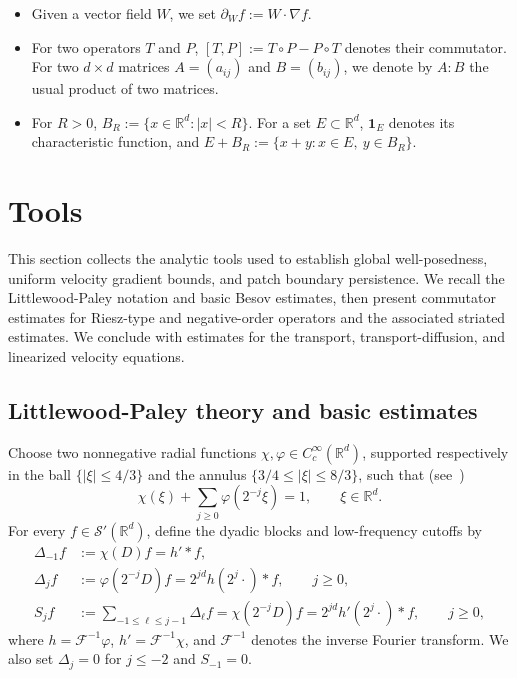 \documentclass[reqno,11pt,a4paper]{amsart}
\newcommand{\R}{\ensuremath{\mathbb{R}}}
\begin{document}
\begin{itemize}
    \item
    Given a vector field $W$, we set
    $\partial_{W}f:=W\cdot\nabla f$.

    \item
    For two operators $T$ and $P$,
    $[T,P]:=T\circ P-P\circ T$ denotes their commutator.
    For two $d\times d$ matrices $A=(a_{ij})$ and $B=(b_{ij})$, we denote by
    $A:B$ the usual product of two matrices.
    \item
    For $R>0$, $B_{R}:=\{x\in\mathbb{R}^{d}:|x|<R\}$.
    For a set $E\subset\mathbb{R}^{d}$, $\mathbf{1}_{E}$ denotes its
    characteristic function, and
    $E+B_{R}:=\{x+y:x\in E,\ y\in B_{R}\}$.
\end{itemize}

\section{Tools}\label{sec:tools}
This section collects the analytic tools used to establish
global well-posedness, uniform velocity gradient bounds,
and patch boundary persistence.
We recall the Littlewood-Paley notation and basic
Besov estimates, then present commutator estimates
for Riesz-type and negative-order operators
and the associated striated estimates.
We conclude with estimates for the transport,
transport-diffusion, and linearized velocity equations.

\subsection{Littlewood-Paley theory and basic estimates}
\label{subsec:basic-tools}

Choose two nonnegative radial functions
$\chi,\varphi\in C_c^\infty(\R^d)$,
supported respectively in the ball
$\{|\xi|\leq4/3\}$ and the annulus
$\{3/4\leq|\xi|\leq8/3\}$,
such that (see~\cite{BCD11,LR02})
\begin{equation}\label{eq:POU}
  \chi(\xi)+\sum_{j\geq0}\varphi(2^{-j}\xi)=1,
  \qquad \xi\in\R^d.
\end{equation}
For every $f\in\mathcal S'(\R^d)$,
define the dyadic blocks and low-frequency cutoffs by
\begin{align}\label{exp:Del-Sj}
  \Delta_{-1}f
  &:=\chi(D)f=h'*f,
  \nonumber\\
  \Delta_jf
  &:=\varphi(2^{-j}D)f
  =2^{jd}h(2^j\cdot)*f,
  \qquad j\geq0,
  \nonumber\\
  S_jf
  &:=\sum_{-1\leq\ell\leq j-1}\Delta_\ell f
  =\chi(2^{-j}D)f
  =2^{jd}h'(2^j\cdot)*f,
  \qquad j\geq0,
\end{align}
where $h=\mathcal F^{-1}\varphi$,
$h'=\mathcal F^{-1}\chi$,
and $\mathcal F^{-1}$ denotes the inverse Fourier transform.
We also set $\Delta_j=0$ for $j\leq-2$ and $S_{-1}=0$.
\end{document}
